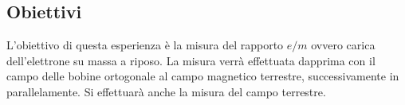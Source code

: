 \subsection{Obiettivi}
L'obiettivo di questa esperienza è la misura del rapporto $e/m$ ovvero carica dell'elettrone su massa a riposo.
La misura verrà effettuata dapprima con il campo delle bobine ortogonale al campo magnetico terrestre, successivamente in parallelamente.
Si effettuarà anche la misura del campo terrestre.

